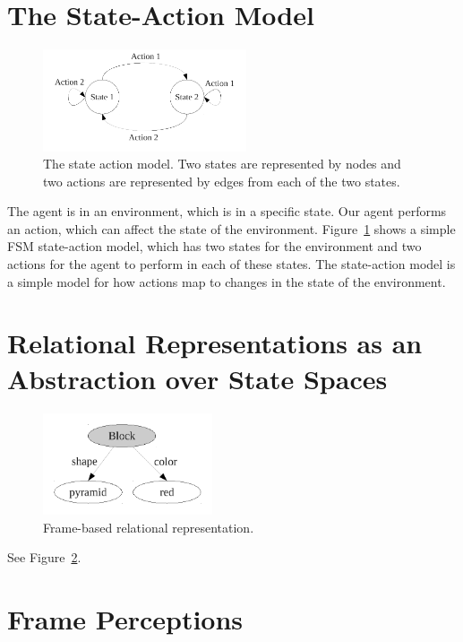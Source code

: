 \section{The State-Action Model}

\begin{figure}[bth]
  \center
  \includegraphics[width=6cm]{gfx/state_action}
  \caption[The state-action model]{The state action model.  Two states
    are represented by nodes and two actions are represented by edges
    from each of the two states.}
  \label{fig:state_action}
\end{figure}

The agent is in an environment, which is in a specific state.  Our
agent performs an action, which can affect the state of the
environment.  Figure~\ref{fig:state_action} shows a simple \ac{FSM}
state-action model, which has two states for the environment and two
actions for the agent to perform in each of these states.  The
state-action model is a simple model for how actions map to changes in
the state of the environment.

\section{Relational Representations as an Abstraction over State Spaces}

\begin{figure}[bth]
  \center
  \includegraphics[height=3cm]{gfx/frame_representation}
  \caption[Frame-based relational representation.]{Frame-based relational representation.}
  \label{fig:frame_representation}
\end{figure}

See Figure~\ref{fig:frame_representation}.

\section{Frame Perceptions}


